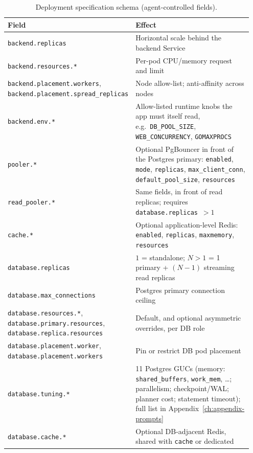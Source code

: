 \begin{table}[t]
  \centering
  \caption{Deployment specification schema (agent-controlled fields).}
  \label{tab:spec-schema}
  \small
  \renewcommand{\arraystretch}{1.12}
  \begin{tabular}{@{}p{0.42\linewidth}p{0.53\linewidth}@{}}
    \toprule
    \textbf{Field} & \textbf{Effect} \\
    \midrule
    \rowcolor{black!5}
    \texttt{backend.replicas} & Horizontal scale behind the backend Service \\
    \texttt{backend.resources.*} & Per-pod CPU/memory request and limit \\
    \rowcolor{black!5}
    \texttt{backend.placement.workers}, \texttt{backend.placement.\allowbreak spread\_replicas} & Node allow-list; anti-affinity across nodes \\
    \texttt{backend.env.*} & Allow-listed runtime knobs the app must itself read, e.g.\ \texttt{DB\_POOL\_SIZE}, \texttt{WEB\_CONCURRENCY}, \texttt{GOMAXPROCS} \\
    \rowcolor{black!5}
    \texttt{pooler.*} & Optional PgBouncer in front of the Postgres primary: \texttt{enabled}, \texttt{mode}, \texttt{replicas}, \texttt{max\_client\_conn}, \texttt{default\_pool\_size}, \texttt{resources} \\
    \texttt{read\_pooler.*} & Same fields, in front of read replicas; requires \texttt{database.replicas}~$>1$ \\
    \rowcolor{black!5}
    \texttt{cache.*} & Optional application-level Redis: \texttt{enabled}, \texttt{replicas}, \texttt{maxmemory}, \texttt{resources} \\
    \texttt{database.replicas} & $1$ = standalone; $N{>}1$ = 1 primary + $(N{-}1)$ streaming read replicas \\
    \rowcolor{black!5}
    \texttt{database.max\_connections} & Postgres primary connection ceiling \\
    \texttt{database.resources.*}, \texttt{database.primary.resources}, \texttt{database.replica.resources} & Default, and optional asymmetric overrides, per DB role \\
    \rowcolor{black!5}
    \texttt{database.placement.worker}, \texttt{database.placement.workers} & Pin or restrict DB pod placement \\
    \texttt{database.tuning.*} & 11 Postgres GUCs (memory: \texttt{shared\_buffers}, \texttt{work\_mem}, \ldots; parallelism; checkpoint/WAL; planner cost; statement timeout); full list in Appendix~\ref{ch:appendix-prompts} \\
    \rowcolor{black!5}
    \texttt{database.cache.*} & Optional DB-adjacent Redis, shared with \texttt{cache} or dedicated \\
    \bottomrule
  \end{tabular}
\end{table}

